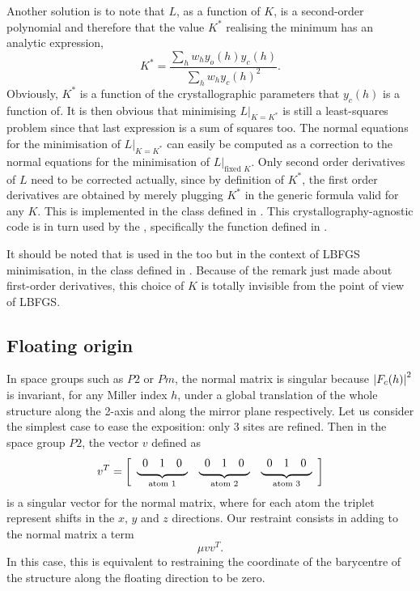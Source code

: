 \documentclass[12pt]{article}
\begin{document}
Another solution is to note that $L$, as a function of $K$, is a second-order polynomial and therefore that the value $K^*$ realising the minimum has an analytic expression,
\begin{equation}
K^* = \frac{\sum_h w_h y_o(h) y_c(h)}{\sum_h w_h y_c(h)^2}.
\label{eqn:optimalK}
\end{equation}
Obviously, $K^*$ is a function of the crystallographic parameters that $y_c(h)$ is a function of. It is then obvious that minimising $L|_{K=K^*}$ is still a least-squares problem since that last expression is a sum of squares too.  The normal equations for the minimisation of $L|_{K=K^*}$ can easily be computed as a correction to the normal equations for the minimisation of $L|_{\text{fixed $K$}}$. Only second order derivatives of $L$ need to be corrected actually, since by definition of $K^*$, the first order derivatives are obtained by merely plugging $K^*$ in the generic formula valid for any $K$. This is implemented in the \cpp class  defined in . This crystallography-agnostic code is in turn used by the \smtbx, specifically the function  defined in .

It should be noted that  is used in the \cctbx too but in the context of LBFGS minimisation, in the \cpp class  defined in . Because of the remark just made about first-order derivatives, this choice of $K$ is totally invisible from the point of view of LBFGS.

\subsection{Floating origin}

In space groups such as $P2$ or $Pm$, the normal matrix is singular because $\left| F_c(h) \right|^2$ is invariant, for any Miller index $h$, under a global translation of the whole structure along the 2-axis and along the mirror plane respectively. Let us consider the simplest case to ease the exposition: only 3 sites are refined. Then in the space group $P2$, the vector $v$ defined as
\newcommand{\tmp}[1]{\underbrace{\protect\begin{array}{ccc} 0&1&0 \end{array}}_{\text{atom #1}}}
\begin{equation}
v^T = \left[ \begin{array}{ccc} \tmp{1} & \tmp{2} & \tmp{3} \end{array} \right]
\end{equation}
is a singular vector for the normal matrix, where for each atom the triplet represent shifts in the $x$, $y$ and $z$ directions. Our restraint consists in adding to the normal matrix a term
\begin{equation}
\mu v v^T.
\end{equation}
In this case, this is equivalent to restraining the coordinate of the barycentre of the structure along the floating direction to be zero.
\end{document}
